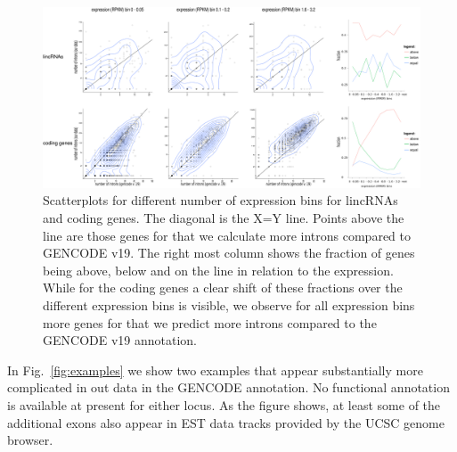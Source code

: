 \documentclass[ncrna,article,submit,moreauthors,pdftex,10pt,a4paper]{mdpi}
\begin{document}
\begin{figure}[ht]
  \begin{center}
    \includegraphics[width=\textwidth]{Fig1}
  \end{center}
  \caption{Scatterplots for different number of expression bins for lincRNAs and coding genes. 
The diagonal is the X=Y line. Points above the line are those genes for that we calculate more introns compared to GENCODE v19.
The right most column shows the fraction of genes being above, below and on the line  in relation to the expression.
While for the coding genes a clear shift of these fractions over the different expression bins is visible, we observe for all expression bins more genes for that we predict more introns compared to the GENCODE v19 annotation.}  
  \label{fig:compare}
\end{figure}

In Fig.~\ref{fig:examples} we show two examples that appear substantially
more complicated in out data in the GENCODE annotation. No functional
annotation is available at present for either locus. As the figure shows,
at least some of the additional exons also appear in EST data tracks
provided by the UCSC genome browser. 
\end{document}
